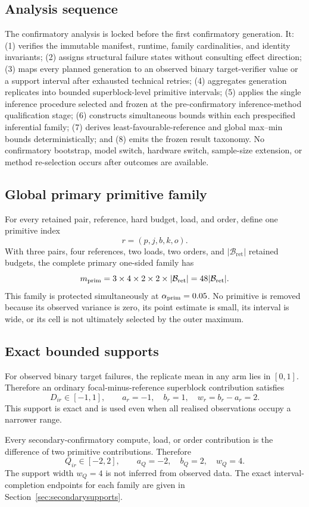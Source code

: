 \documentclass[11pt,a4paper]{article}
\newcommand{\Bret}{\mathcal B_{\mathrm{ret}}}
\begin{document}
\subsection{Analysis sequence}
The confirmatory analysis is locked before the first confirmatory generation. It: (1) verifies the immutable manifest, runtime, family cardinalities, and identity invariants; (2) assigns structural failure states without consulting effect direction; (3) maps every planned generation to an observed binary target-verifier value or a support interval after exhausted technical retries; (4) aggregates generation replicates into bounded superblock-level primitive intervals; (5) applies the single inference procedure selected and frozen at the pre-confirmatory inference-method qualification stage; (6) constructs simultaneous bounds within each prespecified inferential family; (7) derives least-favourable-reference and global max--min bounds deterministically; and (8) emits the frozen result taxonomy. No confirmatory bootstrap, model switch, hardware switch, sample-size extension, or method re-selection occurs after outcomes are available.

\subsection{Global primary primitive family}
For every retained pair, reference, hard budget, load, and order, define one primitive index
\[
r=(p,j,b,k,o).
\]
With three pairs, four references, two loads, two orders, and $|\Bret|$ retained budgets, the complete primary one-sided family has
\[
m_{\rm prim}=3\times4\times2\times2\times|\Bret|=48|\Bret|.
\]
This family is protected simultaneously at $\alpha_{\rm prim}=0.05$. No primitive is removed because its observed variance is zero, its point estimate is small, its interval is wide, or its cell is not ultimately selected by the outer maximum.

\subsection{Exact bounded supports}
For observed binary target failures, the replicate mean in any arm lies in $[0,1]$. Therefore an ordinary focal-minus-reference superblock contribution satisfies
\[
D_{ir}\in[-1,1],\qquad a_r=-1,\quad b_r=1,\quad w_r=b_r-a_r=2.
\]
This support is exact and is used even when all realised observations occupy a narrower range.

Every secondary-confirmatory compute, load, or order contribution is the difference of two primitive contributions. Therefore
\[
Q_{ir}\in[-2,2],\qquad a_Q=-2,\quad b_Q=2,\quad w_Q=4.
\]
The support width $w_Q=4$ is not inferred from observed data. The exact interval-completion endpoints for each family are given in Section~\ref{sec:secondarysupports}.
\end{document}
